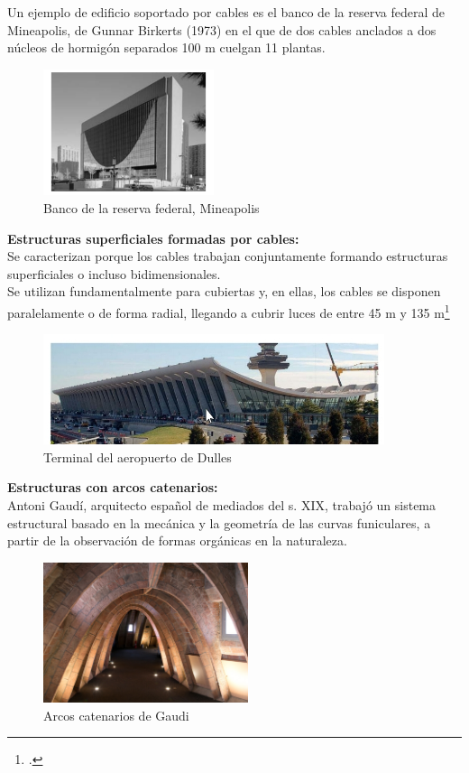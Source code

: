 \framebreak
Un ejemplo de edificio soportado por cables es el banco de la reserva federal de Mineapolis, de Gunnar Birkerts (1973) en el que de dos cables anclados a dos núcleos de hormigón separados 100 m cuelgan 11 plantas.
    \begin{figure}[h]
       \includegraphics[width=5cm]{Imagenes/BancoR.jpg}
                \centering
                \caption{Banco de la reserva federal, Mineapolis}
    \end{figure}

\framebreak
\textbf{Estructuras  superficiales formadas por cables:}
\\Se caracterizan porque los cables trabajan conjuntamente formando estructuras superficiales o incluso bidimensionales.
\\Se utilizan fundamentalmente para cubiertas y, en ellas, los cables se disponen paralelamente o de forma radial, llegando a cubrir luces de entre 45 m y 135 m\footcite{Lui15}
    \begin{figure}[h]
       \includegraphics[width=10cm]{Imagenes/Aeroupuerto.jpg}
                \centering
                \caption{Terminal del aeropuerto de Dulles}
    \end{figure}

\framebreak
\textbf{Estructuras  con arcos catenarios:}
\\Antoni Gaudí, arquitecto español de mediados del s. XIX, trabajó un sistema estructural basado en la mecánica y la geometría de las curvas funiculares, a partir de la observación de formas orgánicas en la naturaleza.
    \begin{figure}[h]
       \includegraphics[width=6cm]{Imagenes/ArcosCate.jpg}
       \caption{Arcos catenarios de Gaudi}
                \centering
    \end{figure}

